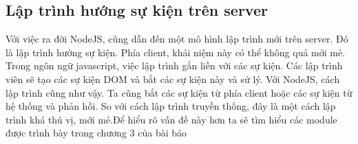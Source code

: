 \subsection{Lập trình hướng sự kiện trên server}
	Với việc ra đời NodeJS, cũng dẫn đến một mô hình lập trình mới trên server. Đó là lập trình hướng sự kiện. Phía client, khái niệm này có thể không quá mới mẻ. Trong ngôn ngữ javascript, việc lập trình gắn liền với các sự kiện. Các lập trình viên sẽ tạo các sự kiện DOM và bắt các sự kiện này và sử lý. Với NodeJS, cách lập trình cũng như vậy. Ta cũng bắt các sự kiện từ phía client hoặc các sự kiện từ hệ thống và phản hồi. So với cách lập trình truyền thống, đây là một cách lập trình khá thú vị, mới mẻ.Để hiểu rõ vấn đề này hơn ta sẽ tìm hiểu các module được trình bày trong chương 3 của bài báo

